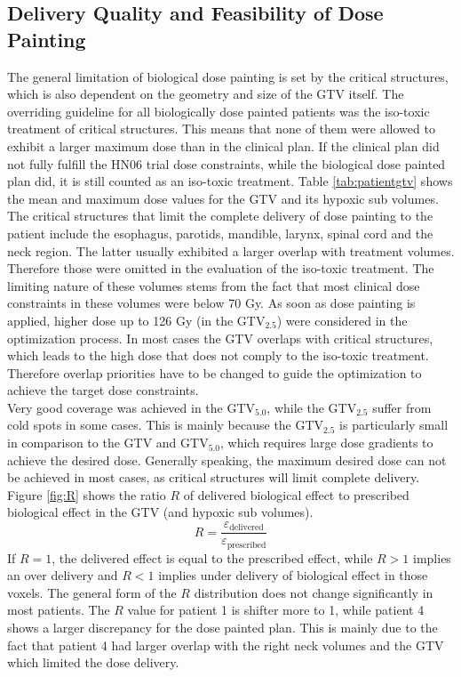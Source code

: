 \subsection{Delivery Quality and Feasibility of Dose Painting}The general limitation of biological dose painting is set by the critical structures, which is also dependent on the geometry and size of the GTV itself. The overriding guideline for all biologically dose painted patients was the iso-toxic treatment of critical structures. This means that none of them were allowed to exhibit a larger maximum dose than in the clinical plan. If the clinical plan did not fully fulfill the HN06 trial dose constraints, while the biological dose painted plan did, it is still counted as an iso-toxic treatment. Table \ref{tab:patientgtv} shows the mean and maximum dose values for the GTV and its hypoxic sub volumes. The critical structures that limit the complete delivery of dose painting to the patient include the esophagus, parotids, mandible, larynx, spinal cord and the neck region. The latter usually exhibited a larger overlap with treatment volumes. Therefore those were omitted in the evaluation of the iso-toxic treatment. The limiting nature of these volumes stems from the fact that most clinical dose constraints in these volumes were below 70 Gy. As soon as dose painting is applied, higher dose up to 126 Gy (in the GTV$_{2.5}$) were considered in the optimization process. In most cases the GTV overlaps with critical structures, which leads to the high dose that does not comply to the iso-toxic treatment. Therefore overlap priorities have to be changed to guide the optimization to achieve the target dose constraints.\\Very good coverage was achieved in the GTV$_{5.0}$, while the GTV$_{2.5}$ suffer from cold spots in some cases. This is mainly because the GTV$_{2.5}$ is particularly small in comparison to the GTV and GTV$_{5.0}$, which requires large dose gradients to achieve the desired dose. Generally speaking, the maximum desired dose can not be achieved in most cases, as critical structures will limit complete delivery.\\Figure \ref{fig:R} shows the ratio $R$ of delivered biological effect to prescribed biological effect in the GTV (and hypoxic sub volumes). 
\begin{equation}
R = \frac{\varepsilon_\mathrm{delivered}}{\varepsilon_\mathrm{prescribed}}
\end{equation}
If $R=1$, the delivered effect is equal to the prescribed effect, while $R>1$ implies an over delivery and $R<1$ implies under delivery of biological effect in those voxels. The general form of the $R$ distribution does not change significantly in most patients. The $R$ value for patient 1 is shifter more to 1, while patient 4 shows a larger discrepancy for the dose painted plan. This is mainly due to the fact that patient 4 had larger overlap with the right neck volumes and the GTV which limited the dose delivery.
